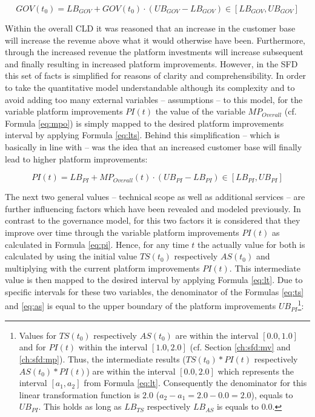 \begin{equation}\label{eq:gov}
	GOV(t_0) = LB_{GOV} + GOV(t_0) \cdot (UB_{GOV} - LB_{GOV}) \in [LB_{GOV},UB_{GOV}]
\end{equation}

Within the overall \ac{CLD} it was reasoned that an increase in the customer base will increase the revenue above what it would otherwise have been. Furthermore, through the increased revenue the platform investments will increase subsequent and finally resulting in increased platform improvements. However, in the \ac{SFD} this set of facts is simplified for reasons of clarity and comprehensibility. In order to take the quantitative model understandable although its complexity and to avoid adding too many external variables -- assumptions -- to this model, for the variable  platform improvements $PI(t)$ the value of the variable $MP_{Overall}$ (cf. Formula \ref{eq:mpo}) is simply mapped to the desired platform improvements interval by applying Formula \ref{eq:lts}. Behind this simplification -- which is basically in line with \citet[p. 200]{Evans2003} -- was the idea that an increased customer base will finally lead to higher platform improvements:

\begin{equation}\label{eq:pi}
	PI(t) = LB_{PI} + MP_{Overall}(t) \cdot (UB_{PI} - LB_{PI}) \in [LB_{PI},UB_{PI}]
\end{equation}

The next two general values -- technical scope as well as additional services -- are further influencing factors which have been revealed and modeled previously. In contrast to the governance model, for this two factors it is considered that they improve over time through the variable platform improvements $PI(t)$ as calculated in Formula \ref{eq:pi}. Hence, for any time $t$ the actually value for both is calculated by using the initial value $TS(t_0)$ respectively $ AS(t_0)$ and multiplying with the current platform improvements $PI(t)$. This intermediate value is then mapped to the desired interval by applying Formula \ref{eq:lt}. Due to specific intervals for these two variables, the denominator of the Formulas \ref{eq:ts} and \ref{eq:as} is equal to the upper boundary of the platform improvements $UB_{PI}$\footnote{Values for $TS(t_0)$ respectively $AS(t_0)$ are within the interval $[0.0,1.0]$ and for $PI(t)$ within the interval $[1.0,2.0]$ (cf. Section \ref{ch:sfd:mv} and \ref{ch:sfd:mp}). Thus, the intermediate results ($TS(t_0)*PI(t)$ respectively $AS(t_0) *PI(t)$) are within the interval $[0.0,2.0]$ which represents the interval $[a_1,a_2]$ from Formula \ref{eq:lt}. Consequently the denominator for this linear transformation function is $2.0$ ($a_2 - a_1 = 2.0 - 0.0 = 2.0$), equals to $UB_{PI}$. This holds as long as $LB_{TS}$ respectively $LB_{AS}$ is equals to $0.0$.}:

